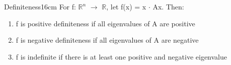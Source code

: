     \begin{definition}{Definiteness}{16cm}
        For f: $\mathbb{R}^n$ $\rightarrow$ $\mathbb{R}$,
        let f(x) = x $\cdot$ Ax. Then:

        \begin{enumerate}[label=(\alph*), leftmargin=1cm, itemsep=0.1cm]
            \item f is {\color{lgreen} positive definiteness} if all
                eigenvalues of A are positive

            \item f is {\color{lgreen} negative definiteness} if all
                eigenvalues of A are negative

            \item f is {\color{lgreen} indefinite} if there is at least one
                positive and negative eigenvalue
        \end{enumerate}
    \end{definition}


















































